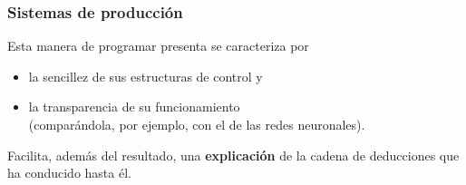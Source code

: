 \documentclass{beamer}    %
\begin{document}
\begin{frame}
 \frametitle{Sistemas de producción}

 Esta manera de programar presenta se caracteriza por

 \begin{itemize}
 \item
 la sencillez de sus estructuras de control y

 \item
 la transparencia de su funcionamiento\\[2mm]

 (comparándola, por ejemplo, con el de las redes neuronales).
 \end{itemize}
 \vspace{5mm}

 Facilita, además del resultado, una {\bf explicación} de la
 cadena de deducciones que ha conducido hasta él.
\end{frame}
\end{document}
